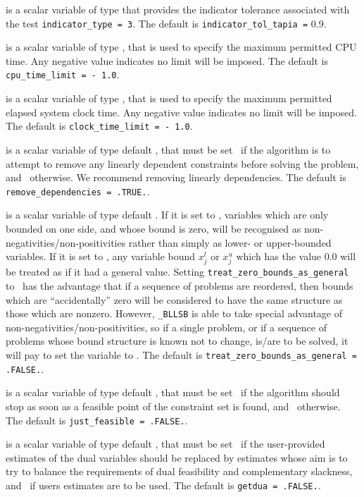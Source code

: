 \documentclass{galahad}
\newcommand{\packagename}{BLLSB}
\newcommand{\fullpackagename}{\libraryname\_\packagename}
\begin{document}
\begin{description}
is a scalar variable of type \realdp that
provides the indicator tolerance associated with the test
{\tt indicator\_type = 3}.
The default is {\tt indicator\_tol\-\_tapia =} 0.9.

 is a scalar variable of type \realdp,
that is used to specify the maximum permitted CPU time. Any negative
value indicates no limit will be imposed. The default is
{\tt cpu\_time\_limit = - 1.0}.

 is a scalar variable of type \realdp,
that is used to specify the maximum permitted elapsed system clock time.
Any negative value indicates no limit will be imposed. The default is
{\tt clock\_time\_limit = - 1.0}.

 is a scalar variable of type
default \logical, that must be set \true\ if the algorithm
is to attempt to remove any linearly dependent constraints before
solving the problem, and \false\ otherwise.
We recommend removing linearly dependencies.
The default is {\tt remove\_dependencies = .TRUE.}.

 is a scalar variable of type
default \logical.
If it is set to \false, variables which
are only bounded on one side, and whose bound is zero,
will be recognised as non-negativities/non-positivities rather than simply as
lower- or upper-bounded variables.
If it is set to \true, any variable bound
$x_{j}^{l}$ or $x_{j}^{u}$ which has the value 0.0 will be
treated as if it had a general value.
Setting {\tt treat\_zero\_bounds\_as\_general} to \true\ has the advantage
that if a sequence of problems are reordered, then bounds which are
``accidentally'' zero will be considered to have the same structure as
those which are nonzero. However, {\tt \fullpackagename} is
able to take special advantage of non-negativities/non-positivities, so
if a single problem, or if a sequence of problems whose
bound structure is known not to change, is/are to be solved,
it will pay to set the variable to \false.
The default is {\tt treat\_zero\_bounds\_as\_general = .FALSE.}.

 is a scalar variable of type default \logical, that
must be set \true\ if the algorithm should stop as soon as a feasible point
of the constraint set is found, and \false\ otherwise.
The default is {\tt just\_feasible = .FALSE.}.

 is a scalar variable of type default \logical, that
must be set \true\ if the user-provided estimates of the dual variables
should be replaced by estimates whose aim is to try to balance the
requirements of dual feasibility and complementary slackness,
and \false\ if users estimates are to be used.
The default is {\tt getdua = .FALSE.}.


\end{description}
\end{document}
